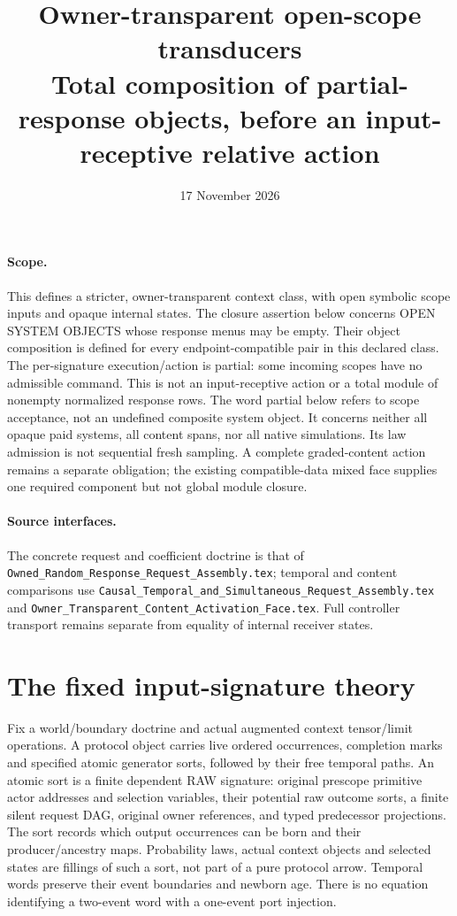 \documentclass[11pt]{article}\usepackage{amsmath,amssymb,amsthm,geometry}\geometry{margin=1in}
\title{Owner-transparent open-scope transducers\\Total composition of partial-response objects, before an input-receptive relative action}
\date{17 November 2026}
\begin{document}
\maketitle
\paragraph{Scope.} This defines a stricter, owner-transparent context class, with open symbolic scope inputs and opaque internal states. The closure assertion below concerns OPEN SYSTEM OBJECTS whose response menus may be empty. Their object composition is defined for every endpoint-compatible pair in this declared class. The per-signature execution/action is partial: some incoming scopes have no admissible command. This is not an input-receptive action or a total module of nonempty normalized response rows. The word partial below refers to scope acceptance, not an undefined composite system object. It concerns neither all opaque paid systems, all content spans, nor all native simulations. Its law admission is not sequential fresh sampling. A complete graded-content action remains a separate obligation; the existing compatible-data mixed face supplies one required component but not global module closure.

\paragraph{Source interfaces.} The concrete request and coefficient doctrine is that of \texttt{Owned\_Random\_Response\_Request\_Assembly.tex}; temporal and content comparisons use \texttt{Causal\_Temporal\_and\_Simultaneous\_Request\_Assembly.tex} and \texttt{Owner\_Transparent\_Content\_Activation\_Face.tex}. Full controller transport remains separate from equality of internal receiver states.

\section{The fixed input-signature theory}
Fix a world/boundary doctrine and actual augmented context tensor/limit operations. A protocol object carries live ordered occurrences, completion marks and specified atomic generator sorts, followed by their free temporal paths. An atomic sort is a finite dependent RAW signature: original prescope primitive actor addresses and selection variables, their potential raw outcome sorts, a finite silent request DAG, original owner references, and typed predecessor projections. The sort records which output occurrences can be born and their producer/ancestry maps. Probability laws, actual context objects and selected states are fillings of such a sort, not part of a pure protocol arrow. Temporal words preserve their event boundaries and newborn age. There is no equation identifying a two-event word with a one-event port injection.
\end{document}
